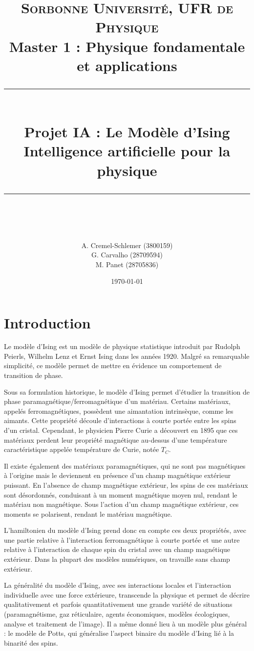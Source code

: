 \documentclass[11pt, parskip=half]{scrartcl} %
\title{	
	\normalfont\normalsize
	\large\textsc{Sorbonne Université, UFR de Physique}\\ %
	\vspace{2pt} %
	\normalsize Master 1 : Physique fondamentale et applications\\
	\vspace{25pt} %
	\rule{\linewidth}{0.5pt}\\ %
	\vspace{20pt} %
	{\huge Projet IA : Le Modèle d'Ising}\\ %
	\vspace{2pt} %
	{Intelligence artificielle pour la physique}\\
	\vspace{12pt} %
	\rule{\linewidth}{2pt}\\ %
	\vspace{12pt} %
}
\author{\LARGE A. Cremel-Schlemer \large (3800159) \\ \LARGE G. Carvalho \large (28709594) \\ \LARGE M. Panet \large (28705836)} %
\date{\normalsize\today} %
\begin{document}
\maketitle %
\tableofcontents %

\newpage

\section*{Introduction}

Le modèle d'Ising est un modèle de physique statistique introduit par Rudolph Peierls, Wilhelm Lenz et Ernst Ising dans les années 1920. Malgré sa remarquable simplicité, ce modèle permet de mettre en évidence un comportement de transition de phase.

Sous sa formulation historique, le modèle d'Ising permet d'étudier la transition de phase paramagnétique/ferromagnétique d'un matériau. Certains matériaux, appelés ferromagnétiques, possèdent une aimantation intrinsèque, comme les aimants. Cette propriété découle d'interactions à courte portée entre les spins d'un cristal. Cependant, le physicien Pierre Curie a découvert en 1895 que ces matériaux perdent leur propriété magnétique au-dessus d'une température caractéristique appelée température de Curie, notée $T_C$.

Il existe également des matériaux paramagnétiques, qui ne sont pas magnétiques à l'origine mais le deviennent en présence d'un champ magnétique extérieur puissant. En l'absence de champ magnétique extérieur, les spins de ces matériaux sont désordonnés, conduisant à un moment magnétique moyen nul, rendant le matériau non magnétique. Sous l'action d'un champ magnétique extérieur, ces moments se polarisent, rendant le matériau magnétique.

L'hamiltonien du modèle d'Ising prend donc en compte ces deux propriétés, avec une partie relative à l'interaction ferromagnétique à courte portée et une autre relative à l'interaction de chaque spin du cristal avec un champ magnétique extérieur. Dans la plupart des modèles numériques, on travaille sans champ extérieur.

La généralité du modèle d'Ising, avec ses interactions locales et l'interaction individuelle avec une force extérieure, transcende la physique et permet de décrire qualitativement et parfois quantitativement une grande variété de situations (paramagnétisme, gaz réticulaire, agents économiques, modèles écologiques, analyse et traitement de l'image). Il a même donné lieu à un modèle plus général : le modèle de Potts, qui généralise l'aspect binaire du modèle d'Ising lié à la binarité des spins.
\end{document}
